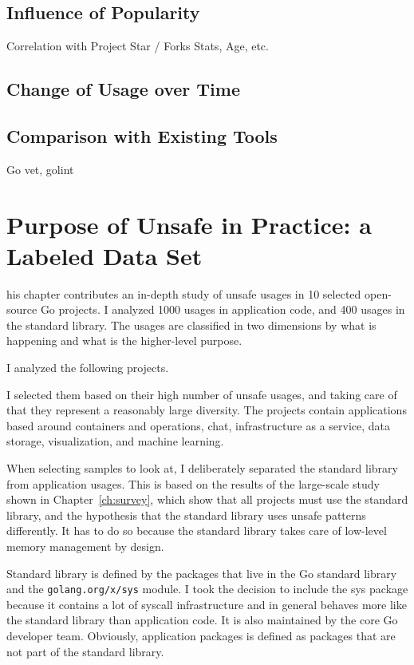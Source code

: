 \subsection{Influence of Popularity}

Correlation with Project Star / Forks Stats, Age, etc.


\subsection{Change of Usage over Time}

\subsection{Comparison with Existing Tools}

Go vet, golint


\section{Purpose of Unsafe in Practice: a Labeled Data Set}

his chapter contributes an in-depth study of unsafe usages in 10 selected open-source Go projects.
I analyzed 1000 usages in application code, and 400 usages in the standard library.
The usages are classified in two dimensions by what is happening and what is the higher-level purpose.

I analyzed the following projects.



I selected them based on their high number of unsafe usages, and taking care of that they represent a reasonably large
diversity.
The projects contain applications based around containers and operations, chat, infrastructure as a service, data
storage, visualization, and machine learning.

When selecting samples to look at, I deliberately separated the standard library from application usages.
This is based on the results of the large-scale study shown in Chapter~\ref{ch:survey}, which show that all projects
must use the standard library, and the hypothesis that the standard library uses unsafe patterns differently.
It has to do so because the standard library takes care of low-level memory management by design.

Standard library is defined by the packages that live in the Go standard library and the \texttt{golang.org/x/sys}
module.
I took the decision to include the sys package because it contains a lot of syscall infrastructure and in general
behaves more like the standard library than application code.
It is also maintained by the core Go developer team.
Obviously, application packages is defined as packages that are not part of the standard library.

